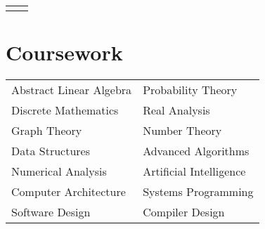 \documentclass[10pt, oneside, openany]{article} %
\begin{document}
\begin{paracol}{2}
\begin{supertabular}{ll}
	

	
	
\end{supertabular}


\section{Coursework}

\begin{tabular}{l l}
Abstract Linear Algebra & Probability Theory\\
Discrete Mathematics & Real Analysis\\
Graph Theory & Number Theory\\
Data Structures & Advanced Algorithms\\
Numerical Analysis & Artificial Intelligence\\
Computer Architecture & Systems Programming\\
Software Design & Compiler Design\\
\end{tabular}







\end{paracol}
\end{document}
